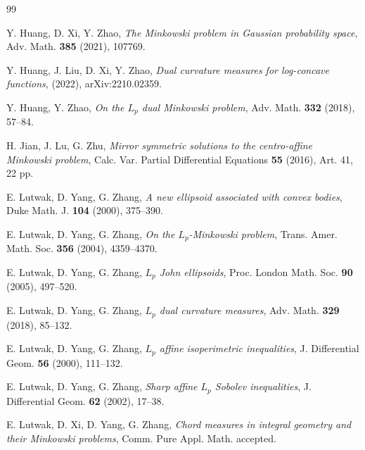 \documentclass[12pt, reqno]{amsart}
\theoremstyle{definition}
\theoremstyle{remark}
\numberwithin{equation}{section}
\newcommand{\Lp}{L_{p}}
\begin{document}
\begin{thebibliography}{99}
			
			
			Y. Huang, D. Xi, Y. Zhao,
			\emph{The Minkowski problem in Gaussian probability space},
			Adv. Math. \textbf{385} (2021), 107769.
			
			Y. Huang, J. Liu, D. Xi, Y. Zhao, \emph{Dual curvature measures for log-concave functions}, (2022), arXiv:2210.02359.
			
			Y. Huang, Y. Zhao, \emph{On the $\Lp$ dual Minkowski problem}, Adv. Math. \textbf{332} (2018), 57--84.
			
			
			H. Jian, J. Lu, G. Zhu, \emph{Mirror symmetric solutions to the centro-affine Minkowski problem}, Calc.
			Var. Partial Differential Equations \textbf{55} (2016), Art. 41, 22 pp.
			
			
			
			E. Lutwak,  D. Yang, G. Zhang,
			\emph{A new ellipsoid associated with convex bodies},
			Duke Math. J. \textbf{104} (2000), 375--390.
			
			E. Lutwak, D. Yang,  G. Zhang, \textit{On the $L_{p}$-Minkowski problem}, Trans. Amer. Math. Soc. \textbf{356} (2004), 4359--4370.
			
			
			E. Lutwak,  D. Yang, G. Zhang,
			\emph{$L_{p}$ John ellipsoids},
			Proc. London Math. Soc. \textbf{90} (2005), 497--520.
			
			
			
			E. Lutwak, D. Yang,  G. Zhang, \textit{$L_{p}$ dual curvature measures}, Adv. Math. \textbf{329} (2018), 85--132.
			
			
			E. Lutwak, D. Yang, G. Zhang,
			\emph{ $ L_{p} $ affine isoperimetric inequalities},
			J. Differential Geom. \textbf{56} (2000), 111--132.
			
			
			
			E. Lutwak, D. Yang, G. Zhang, \emph{Sharp affine $L_{p}$ Sobolev inequalities}, J. Differential Geom.
			\textbf{62} (2002), 17--38.
			
			E. Lutwak, D. Xi, D. Yang, G. Zhang, \emph{Chord measures in integral geometry and their Minkowski
			problems}, Comm. Pure Appl. Math. accepted.
			

\end{thebibliography}
\end{document}
